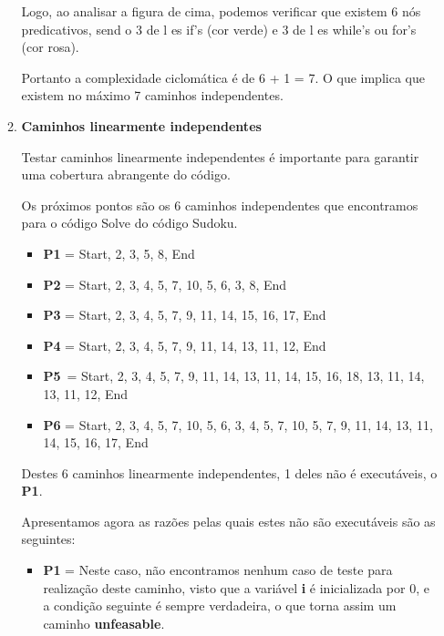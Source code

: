 \documentclass{article}
\begin{document}
\begin{itemize}
\begin{enumerate}
    \quad Logo, ao analisar a figura de cima, podemos verificar que existem 6 nós predicativos, send o  3  de l es if's (cor verde)  e  3  de l es while's ou for's (cor rosa).
  
    Portanto a complexidade ciclomática é de 6 + 1 = 7. O que implica que existem no máximo 7 caminhos independentes.
    
    \item \textbf{Caminhos linearmente independentes}\\
    \texttt{}\par Testar caminhos linearmente independentes é importante para garantir uma cobertura abrangente do código.

  Os próximos pontos são os 6 caminhos independentes que encontramos para o código Solve do código Sudoku.
  \begin{itemize}
    \item \textbf{P1} = {Start, 2, 3, 5, 8, End}
    \item \textbf{P2} = {Start, 2, 3, 4, 5, 7, 10, 5, 6, 3, 8, End}
    \item \textbf{P3} = {Start, 2, 3, 4, 5, 7, 9, 11, 14, 15, 16, 17, End} 
    \item \textbf{P4} = {Start, 2, 3, 4, 5, 7, 9, 11, 14, 13, 11, 12, End}
    \item \textbf{P5} = {Start, 2, 3, 4, 5, 7, 9, 11, 14, 13, 11, 14, 15, 16, 18, 13, 11, 14, 13, 11, 12, End}
   \item \textbf{P6} = {Start, 2, 3, 4, 5, 7, 10, 5, 6, 3, 4, 5, 7, 10, 5, 7, 9, 11, 14, 13, 11, 14, 15, 16, 17, End}
    \end{itemize}
    
  Destes 6 caminhos linearmente independentes, 1 deles não é executáveis, o \textbf{P1}.

  \quad Apresentamos agora as razões pelas quais estes não são executáveis são as seguintes: \\
  \begin{itemize}
    \item \textbf{P1} = Neste caso, não encontramos nenhum caso de teste para realização deste caminho, visto que a variável \textbf{i} é inicializada por 0, e a condição seguinte é sempre verdadeira, o que torna assim um caminho \textbf{unfeasable}.


\end{itemize}
\end{enumerate}
\end{itemize}
\end{document}
